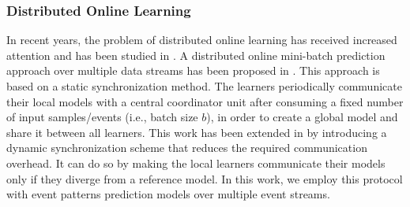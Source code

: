 
\subsubsection*{Distributed Online Learning}
\par In recent years, the problem of distributed online learning has received increased attention and has been studied in \cite{langford2009slow,yan2013distributed,xiao2010dual,dekel2012optimal,kamp2014communication}.  A distributed online mini-batch prediction approach over multiple data streams has been proposed in \cite{dekel2012optimal}. This approach is based on a static synchronization method. The learners periodically communicate  their local models with a central coordinator unit after consuming a fixed number of input samples/events (i.e., batch size $b$), in order to  create a global model and share it between all learners. This work has been extended in \cite{kamp2014communication} by introducing a
dynamic synchronization scheme that reduces the required communication overhead. It can do so by making the local learners communicate their models only if they diverge from a reference model. In this work, we employ this protocol with event patterns prediction models over multiple event streams. 
